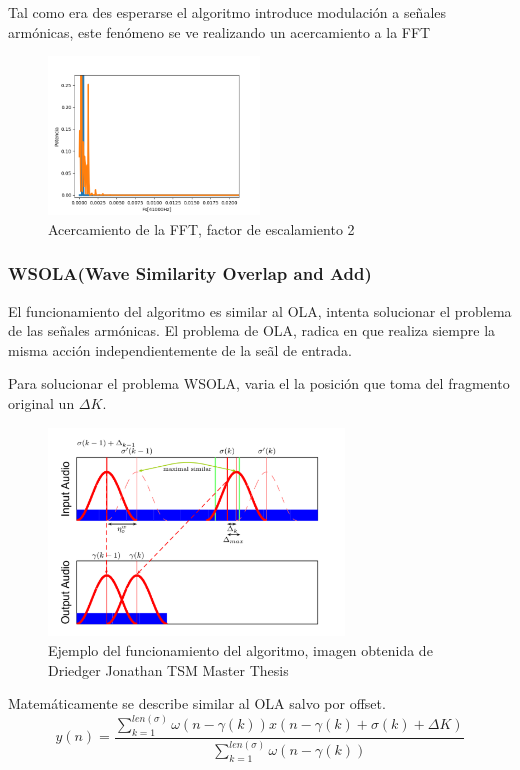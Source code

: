 \documentclass[../ASSD_TP2.tex]{subfiles}
\begin{document}
Tal como era des esperarse el algoritmo introduce modulación a se\~nales armónicas, este fenómeno se ve realizando un acercamiento a la FFT

\begin{figure}[H]
  \centering
   \includegraphics[width=0.5\textwidth]{figures/zoom.png}
  \caption{Acercamiento de la FFT, factor de escalamiento 2}
\end{figure}

\subsubsection*{WSOLA(Wave Similarity Overlap and Add)}
El funcionamiento del algoritmo es similar al OLA, intenta solucionar el problema de las se\~nales armónicas. El problema de OLA, radica en que realiza siempre la misma acción independientemente de la se\~al de entrada.
\par Para solucionar el problema WSOLA, varia el la posición que toma del fragmento original un $\Delta K$.

\begin{figure}[H]
  \centering
   \includegraphics[width=0.7\textwidth]{figures/wsola.png}
  \caption{Ejemplo del funcionamiento del algoritmo, imagen obtenida de Driedger Jonathan TSM Master Thesis}
\end{figure}

Matemáticamente se describe similar al OLA salvo por offset.
\begin{equation}
y(n)=\frac{\sum_{k=1}^{len(\sigma)} \omega(n - \gamma (k)) x(n-\gamma (k) + \sigma (k) + \Delta K)}{\sum_{k=1}^{len(\sigma)}\omega(n - \gamma (k))}
\end{equation}
\end{document}
